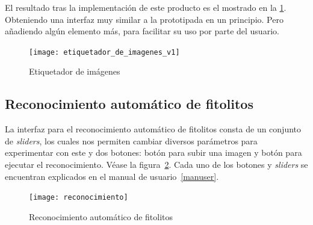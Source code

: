 El resultado tras la implementación de este producto es el mostrado en la \ref{fig:C.5.3}. Obteniendo una interfaz muy similar a la prototipada en un principio. Pero añadiendo algún elemento más, para facilitar su uso por parte del usuario.

\begin{figure}
\centering
\texttt{[image: etiquetador\_de\_imagenes\_v1]}
\caption{Etiquetador de imágenes}
\label{fig:C.5.3}
\end{figure}

\subsection{Reconocimiento automático de fitolitos}

La interfaz para el reconocimiento automático de fitolitos consta de un conjunto de \textit{sliders}, los cuales nos permiten cambiar diversos parámetros para experimentar con este y dos botones: botón para subir una imagen y botón para ejecutar el reconocimiento. Véase la figura~\ref{fig:C.5.4}. Cada uno de los botones y \textit{sliders} se encuentran explicados en el manual de usuario~\ref{manuser}.

\begin{figure}
\centering
\texttt{[image: reconocimiento]}
\caption{Reconocimiento automático de fitolitos}
\label{fig:C.5.4}
\end{figure}